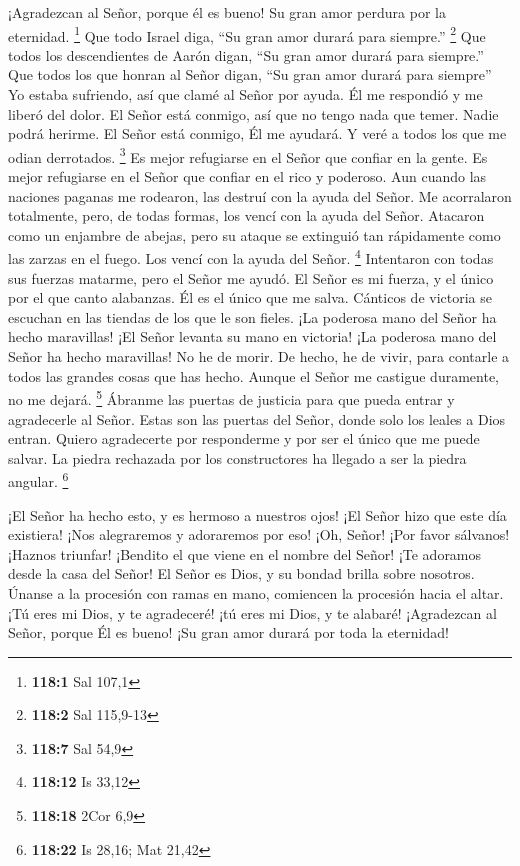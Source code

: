  ¡Agradezcan al Señor, porque él es bueno! Su gran amor
perdura por la eternidad. \footnote{\textbf{118:1} Sal 107,1}
 Que todo Israel diga, ``Su gran amor durará para siempre.''
\footnote{\textbf{118:2} Sal 115,9-13}  Que todos los
descendientes de Aarón digan, ``Su gran amor durará para siempre.''
 Que todos los que honran al Señor digan, ``Su gran amor
durará para siempre''  Yo estaba sufriendo, así que clamé al
Señor por ayuda. Él me respondió y me liberó del dolor.  El
Señor está conmigo, así que no tengo nada que temer. Nadie podrá
herirme.  El Señor está conmigo, Él me ayudará. Y veré a
todos los que me odian derrotados. \footnote{\textbf{118:7} Sal 54,9}
 Es mejor refugiarse en el Señor que confiar en la gente.
 Es mejor refugiarse en el Señor que confiar en el rico y
poderoso.  Aun cuando las naciones paganas me rodearon, las
destruí con la ayuda del Señor.  Me acorralaron totalmente,
pero, de todas formas, los vencí con la ayuda del Señor. 
Atacaron como un enjambre de abejas, pero su ataque se extinguió tan
rápidamente como las zarzas en el fuego. Los vencí con la ayuda del
Señor. \footnote{\textbf{118:12} Is 33,12}  Intentaron con
todas sus fuerzas matarme, pero el Señor me ayudó.  El
Señor es mi fuerza, y el único por el que canto alabanzas. Él es el
único que me salva.  Cánticos de victoria se escuchan en
las tiendas de los que le son fieles. ¡La poderosa mano del Señor ha
hecho maravillas!  ¡El Señor levanta su mano en victoria!
¡La poderosa mano del Señor ha hecho maravillas!  No he de
morir. De hecho, he de vivir, para contarle a todos las grandes cosas
que has hecho.  Aunque el Señor me castigue duramente, no
me dejará. \footnote{\textbf{118:18} 2Cor 6,9}  Ábranme las
puertas de justicia para que pueda entrar y agradecerle al Señor.
 Estas son las puertas del Señor, donde solo los leales a
Dios entran.  Quiero agradecerte por responderme y por ser
el único que me puede salvar.  La piedra rechazada por los
constructores ha llegado a ser la piedra angular. \footnote{\textbf{118:22}
  Is 28,16; Mat 21,42}

 ¡El Señor ha hecho esto, y es hermoso a nuestros ojos!
 ¡El Señor hizo que este día existiera! ¡Nos alegraremos y
adoraremos por eso!  ¡Oh, Señor! ¡Por favor sálvanos!
¡Haznos triunfar!  ¡Bendito el que viene en el nombre del
Señor! ¡Te adoramos desde la casa del Señor!  El Señor es
Dios, y su bondad brilla sobre nosotros. Únanse a la procesión con ramas
en mano, comiencen la procesión hacia el altar.  ¡Tú eres
mi Dios, y te agradeceré! ¡tú eres mi Dios, y te alabaré! 
¡Agradezcan al Señor, porque Él es bueno! ¡Su gran amor durará por toda
la eternidad!

